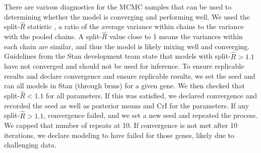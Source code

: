 \documentclass[12pt]{extarticle}
\begin{document}
There are various diagnostics for the MCMC samples that can be used to determining whether the model is converging and performing well. We used the split-$\widehat{R}$ statistic \cite{Gelman2013}, a ratio of the average variance within chains to the variance with the pooled chains. A split-$\widehat{R}$ value close to 1 means the variances within each chain are similar, and thus the model is likely mixing well and converging. Guidelines from the Stan development team state that models with split-$\widehat{R} > 1.1$ have not converged and should not be used for inference. To ensure replicable results and declare convergence and ensure replicable results, we set the seed and ran all models in Stan (through brms) for a given gene. We then checked that split-$\widehat{R} < 1.1$ for all parameters. If this was satisfied, we declared convergence and recorded the seed as well as posterior means and CrI for the parameters. If any split-$\widehat{R} > 1.1$, convergence failed, and we set a new seed and repeated the process. We capped that number of repeats at 10. If convergence is not met after 10 iterations, we declare modeling to have failed for those genes, likely due to challenging data.



\end{document}
